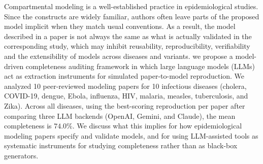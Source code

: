Compartmental modeling is a well-established practice in epidemiological studies. Since the constructs are widely familiar, authors often leave parts of the proposed model implicit when they match usual conventions. As a result, the model described in a paper is not always the same as what is actually validated in the corresponding study, which may inhibit reusability, reproducibility, verifiability and the extensibility of models across diseases and variants. we propose a model-driven completeness auditing framework in which large language models (LLMs) act as extraction instruments for simulated paper-to-model reproduction. We analyzed 10 peer-reviewed modeling papers for 10 infectious diseases (cholera, COVID-19, dengue, Ebola, influenza, HIV, malaria, measles, tuberculosis, and Zika). Across all diseases, using the best-scoring reproduction per paper after comparing three LLM backends (OpenAI, Gemini, and Claude), the mean completeness is $74.0\%$. We discuss what this implies for how epidemiological modeling papers specify and validate models, and for using LLM-assisted tools as systematic instruments for studying completeness rather than as black-box generators.

